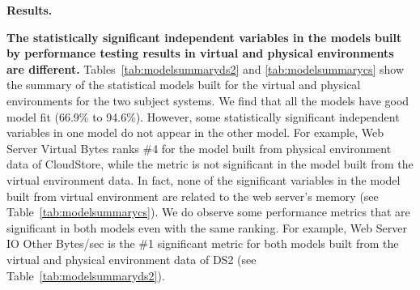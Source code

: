 	
	
	


 
\noindent \textbf{Results.}

\noindent \textbf{The statistically significant independent variables in the models built by performance testing results in virtual and physical environments are different.} Tables~\ref{tab:modelsummaryds2} and \ref{tab:modelsummarycs} show the summary of the statistical models built for the virtual and physical environments for the two subject systems. We find that all the models have good model fit (66.9\% to 94.6\%). However, some statistically significant independent variables in one model do not appear in the other model. For example, Web Server Virtual Bytes ranks \#4 for the model built from physical environment data of CloudStore, while the metric is not significant in the model built from the virtual environment data. In fact, none of the significant variables in the model built from virtual environment are related to the web server's memory (see Table~\ref{tab:modelsummarycs}). We do observe some performance metrics that are significant in both models even with the same ranking. For example, Web Server IO Other Bytes/sec is the \#1 significant metric for both models built from the virtual and physical environment data of DS2 (see Table~\ref{tab:modelsummaryds2}). 

